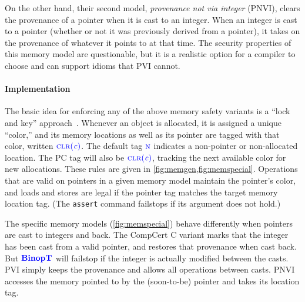 \documentclass{llncs}
\begin{document}
On the other hand, their second model, {\em provenance not via integer} (PNVI), clears the
provenance of a pointer when it is cast to an integer. When an integer is cast to a pointer
(whether or not it was previously derived from a pointer), it takes on the provenance of whatever
it points to at that time. The security properties of this memory model are questionable, but
it is a realistic option for a compiler to choose and can support idioms that PVI cannot.

\paragraph*{Implementation}

The basic idea for enforcing any of the above memory safety variants is a ``lock and key'' approach~\cite{Clause07:MemsafeTainting,Azevedo+15}.
Whenever an object is allocated, it is assigned a unique ``color,'' and its memory locations as well
as its pointer are tagged with that color, written \(\textnormal{\color{blue} \sc clr}{\color{blue}(\mathit{c})}\).
The default tag \(\textnormal{\color{blue} \sc n}\) indicates a non-pointer or non-allocated location.
The PC tag will also be \(\textnormal{\color{blue} \sc clr}{\color{blue}(\mathit{c})}\),
tracking the next available color for new allocations. These rules are given in \cref{fig:memgen,fig:memspecial}. Operations that are valid on pointers in a given memory model
maintain the pointer's color, and loads and stores are legal if the pointer tag matches
the target memory location tag. (The {\tt assert} command failstops if its argument does not hold.)

The specific memory models (\cref{fig:memspecial}) behave differently when pointers are cast to
integers and back.
The CompCert C variant marks that the integer has been cast from a valid pointer, and
restores that provenance when cast back. But \(\color{blue} \mathbf{BinopT}\) will failstop if the integer is
actually modified between the casts. PVI simply keeps the provenance and allows all operations
between casts. PNVI accesses the memory pointed to by the (soon-to-be) pointer and takes its
location tag.
\end{document}
